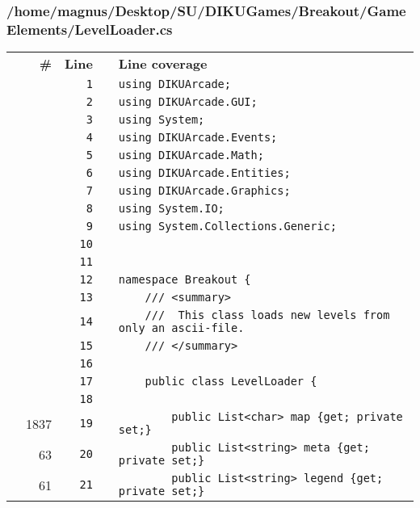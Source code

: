 \documentclass[a4paper,landscape,10pt]{article}
\begin{document}
\subsubsection{/home/magnus/Desktop/SU/DIKUGames/Breakout/GameElements/LevelLoader.cs}
\begin{longtable}[l]{lrrll}
\textbf{} & \textbf{\#} & \textbf{Line} & \textbf{} & \textbf{Line coverage}\\
\cellcolor{gray} &  & \verb~1~ & & \verb~using DIKUArcade;~\\
\cellcolor{gray} &  & \verb~2~ & & \verb~using DIKUArcade.GUI;~\\
\cellcolor{gray} &  & \verb~3~ & & \verb~using System;~\\
\cellcolor{gray} &  & \verb~4~ & & \verb~using DIKUArcade.Events;~\\
\cellcolor{gray} &  & \verb~5~ & & \verb~using DIKUArcade.Math;~\\
\cellcolor{gray} &  & \verb~6~ & & \verb~using DIKUArcade.Entities;~\\
\cellcolor{gray} &  & \verb~7~ & & \verb~using DIKUArcade.Graphics;~\\
\cellcolor{gray} &  & \verb~8~ & & \verb~using System.IO;~\\
\cellcolor{gray} &  & \verb~9~ & & \verb~using System.Collections.Generic;~\\
\cellcolor{gray} &  & \verb~10~ & & \verb~~\\
\cellcolor{gray} &  & \verb~11~ & & \verb~~\\
\cellcolor{gray} &  & \verb~12~ & & \verb~namespace Breakout {~\\
\cellcolor{gray} &  & \verb~13~ & & \verb~    /// <summary>~\\
\cellcolor{gray} &  & \verb~14~ & & \verb~    ///  This class loads new levels from only an ascii-file.~\\
\cellcolor{gray} &  & \verb~15~ & & \verb~    /// </summary>~\\
\cellcolor{gray} &  & \verb~16~ & & \verb~~\\
\cellcolor{gray} &  & \verb~17~ & & \verb~    public class LevelLoader {~\\
\cellcolor{gray} &  & \verb~18~ & & \verb~~\\
\cellcolor{green} & 1837 & \verb~19~ & & \verb~        public List<char> map {get; private set;}~\\
\cellcolor{green} & 63 & \verb~20~ & & \verb~        public List<string> meta {get; private set;}~\\
\cellcolor{green} & 61 & \verb~21~ & & \verb~        public List<string> legend {get; private set;}~\\

\end{longtable}
\end{document}
